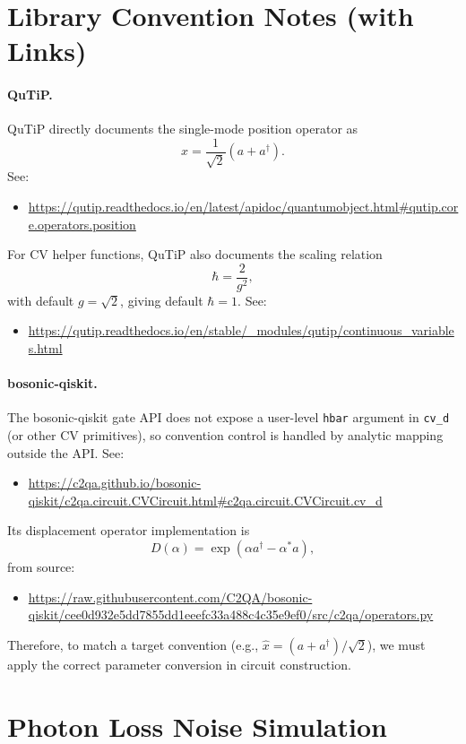 \documentclass[11pt]{article}
\begin{document}
\section{Library Convention Notes (with Links)}
\paragraph{QuTiP.}
QuTiP directly documents the single-mode position operator as
\[
x=\frac{1}{\sqrt{2}}(a+a^\dagger).
\]
See:
\begin{itemize}
\item \url{https://qutip.readthedocs.io/en/latest/apidoc/quantumobject.html#qutip.core.operators.position}
\end{itemize}
For CV helper functions, QuTiP also documents the scaling relation
\[
\hbar = \frac{2}{g^2},
\]
with default $g=\sqrt{2}$, giving default $\hbar=1$. See:
\begin{itemize}
\item \url{https://qutip.readthedocs.io/en/stable/_modules/qutip/continuous_variables.html}
\end{itemize}

\paragraph{bosonic-qiskit.}
The bosonic-qiskit gate API does not expose a user-level \texttt{hbar} argument in
\texttt{cv\_d} (or other CV primitives), so convention control is handled by analytic mapping
outside the API. See:
\begin{itemize}
\item \url{https://c2qa.github.io/bosonic-qiskit/c2qa.circuit.CVCircuit.html#c2qa.circuit.CVCircuit.cv_d}
\end{itemize}
Its displacement operator implementation is
\[
D(\alpha)=\exp(\alpha a^\dagger-\alpha^* a),
\]
from source:
\begin{itemize}
\item \url{https://raw.githubusercontent.com/C2QA/bosonic-qiskit/cee0d932e5dd7855dd1eeefc33a488c4c35e9ef0/src/c2qa/operators.py}
\end{itemize}
Therefore, to match a target convention (e.g., $\hat{x}=(a+a^\dagger)/\sqrt{2}$), we must
apply the correct parameter conversion in circuit construction.

\section{Photon Loss Noise Simulation}
\label{sec:noise}
\end{document}
